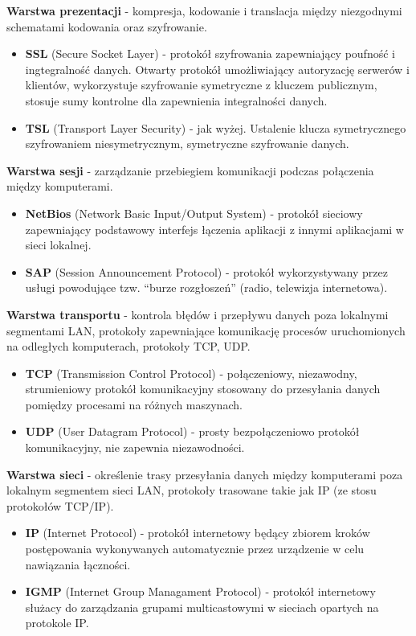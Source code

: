 \documentclass[main.tex]{subfiles}
\begin{document}
    \noindent \textbf{Warstwa prezentacji} - kompresja, kodowanie i
    translacja między niezgodnymi schematami kodowania oraz szyfrowanie.
    \begin{itemize}
        \item \textbf{SSL} (Secure Socket Layer) - protokół szyfrowania zapewniający poufność i ingtegralność danych.
        Otwarty protokół umożliwiający autoryzację serwerów i klientów, wykorzystuje szyfrowanie symetryczne
        z kluczem publicznym, stosuje sumy kontrolne dla zapewnienia integralności danych.
        \item \textbf{TSL} (Transport Layer Security) - jak wyżej. Ustalenie klucza symetrycznego szyfrowaniem niesymetrycznym,
        symetryczne szyfrowanie danych.
    \end{itemize}

    \noindent \textbf{Warstwa sesji} - zarządzanie przebiegiem komunikacji podczas
    połączenia między komputerami.
    \begin{itemize}
        \item \textbf{NetBios} (Network Basic Input/Output System) - protokół sieciowy zapewniający podstawowy interfejs
        łączenia aplikacji z innymi aplikacjami w sieci lokalnej.
        \item \textbf{SAP} (Session Announcement Protocol) - protokół wykorzystywany przez usługi powodujące tzw.
        ``burze rozgłoszeń'' (radio, telewizja internetowa).
    \end{itemize}

    \noindent \textbf{Warstwa transportu} - kontrola błędów i przepływu danych
    poza lokalnymi segmentami LAN, protokoły zapewniające
    komunikację procesów uruchomionych na odległych komputerach, protokoły TCP, UDP.
    \begin{itemize}
        \item \textbf{TCP} (Transmission Control Protocol) - połączeniowy, niezawodny, strumieniowy protokół komunikacyjny
        stosowany do przesyłania danych pomiędzy procesami na różnych maszynach.
        \item \textbf{UDP} (User Datagram Protocol) - prosty bezpołączeniowo protokół komunikacyjny, nie zapewnia
        niezawodności.
    \end{itemize}

    \noindent \textbf{Warstwa sieci} - określenie trasy przesyłania
    danych między komputerami poza lokalnym segmentem sieci LAN, protokoły trasowane takie jak IP (ze stosu protokołów TCP/IP).
    \begin{itemize}
        \item \textbf{IP} (Internet Protocol) - protokół internetowy będący zbiorem kroków
        postępowania wykonywanych automatycznie przez urządzenie w celu nawiązania łączności.
        \item \textbf{IGMP} (Internet Group Managament Protocol) - protokół internetowy służacy do zarządzania
        grupami multicastowymi w sieciach opartych na protokole IP.
    \end{itemize}
\end{document}

